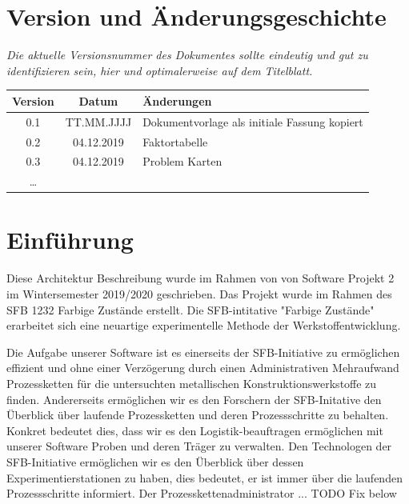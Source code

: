 \documentclass[enabledeprecatedfontcommands,fontsize=12pt,paper=a4,twoside]{scrartcl}
\begin{document}
\newpage



\section*{Version und Änderungsgeschichte}

{\em Die aktuelle Versionsnummer des Dokumentes sollte eindeutig und gut zu
identifizieren sein, hier und optimalerweise auf dem Titelblatt.}

\begin{tabular}{ccl}
Version & Datum & Änderungen \\
\hline
0.1 & TT.MM.JJJJ & Dokumentvorlage als initiale Fassung kopiert \\
0.2 & 04.12.2019 & Faktortabelle \\
0.3 & 04.12.2019 & Problem Karten \\
\ldots
\end{tabular}


\section{Einführung}

Diese Architektur Beschreibung wurde im Rahmen von von Software Projekt 2 im Wintersemester 2019/2020 geschrieben.  Das Projekt wurde im Rahmen des SFB 1232 Farbige Zustände erstellt. Die SFB-intitative "Farbige Zustände" erarbeitet sich eine neuartige experimentelle Methode der Werkstoffentwicklung.

Die Aufgabe unserer Software ist es einerseits der SFB-Initiative zu ermöglichen effizient und ohne einer Verzögerung durch einen Administrativen Mehraufwand Prozessketten für die untersuchten metallischen Konstruktionswerkstoffe zu finden. Andererseits ermöglichen wir es den Forschern der SFB-Initative den Überblick über laufende Prozessketten und deren Prozessschritte zu behalten. Konkret bedeutet dies, dass wir es den Logistik-beauftragen ermöglichen mit unserer Software Proben und deren Träger zu verwalten. Den Technologen der SFB-Initiative ermöglichen wir es den Überblick über dessen Experimentierstationen zu haben, dies bedeutet, er ist immer über die laufenden Prozessschritte informiert.
Der Prozesskettenadministrator ... TODO Fix below
\end{document}
